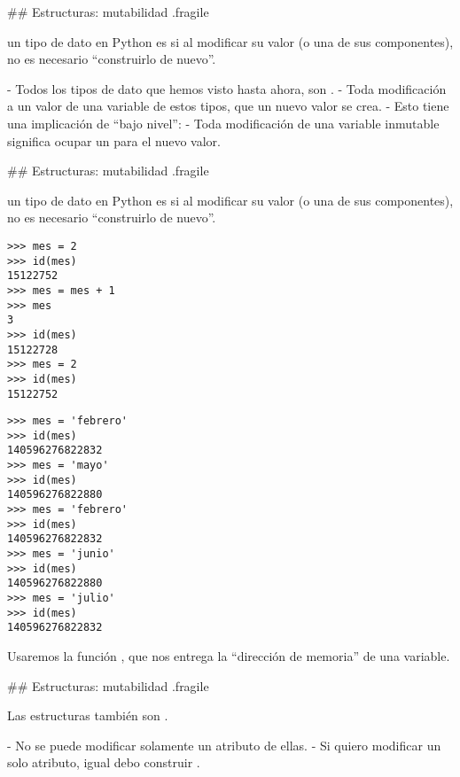 ## Estructuras: mutabilidad {.fragile}

\bgnblockdefinition
{} un tipo de dato en Python es  si al modificar
su valor (o una de sus componentes), no es necesario ``construirlo de nuevo''.
\trmblockdefinition

\vfill

- Todos los tipos de dato que hemos visto hasta ahora, son .
    - Toda modificación a un valor de una variable de estos tipos,  que
    un nuevo valor se crea.
    - Esto tiene una implicación de ``bajo nivel'':
        - Toda modificación de una variable inmutable significa ocupar un  para el nuevo valor.

## Estructuras: mutabilidad {.fragile}

\bgnblockdefinition
{} un tipo de dato en Python es  si al modificar
su valor (o una de sus componentes), no es necesario ``construirlo de nuevo''.
\trmblockdefinition

\vspace{-1ex}

\bgncolumns
{}

\begin{lstlisting}[style=noframe03]
>>> mes = 2
>>> id(mes)
15122752
>>> mes = mes + 1
>>> mes
3
>>> id(mes)
15122728
>>> mes = 2
>>> id(mes)
15122752
\end{lstlisting}


\begin{lstlisting}[style=noframe03]
>>> mes = 'febrero'
>>> id(mes)
140596276822832
>>> mes = 'mayo'
>>> id(mes)
140596276822880
>>> mes = 'febrero'
>>> id(mes)
140596276822832
>>> mes = 'junio'
>>> id(mes)
140596276822880
>>> mes = 'julio'
>>> id(mes)
140596276822832
\end{lstlisting}


\bgnblockidea
\raggedright
Usaremos la función , que nos entrega la ``dirección de memoria''
de una variable.
\trmblockidea


\trmcolumns

## Estructuras: mutabilidad {.fragile}

\bgnblockdefinition
Las estructuras también son .
\trmblockdefinition

- No se puede modificar solamente un atributo de ellas.
- Si quiero modificar un solo atributo, igual debo construir .

